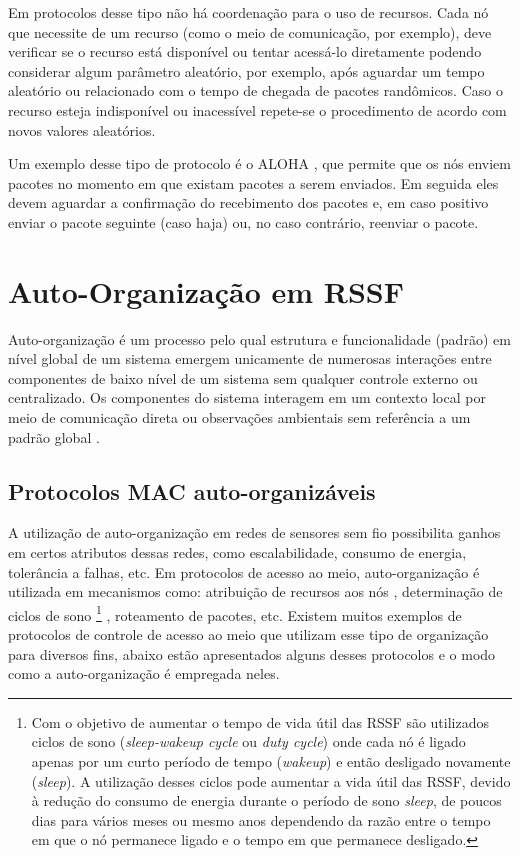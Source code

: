  Em protocolos desse tipo não há coordenação para o uso de recursos. Cada nó que necessite de um recurso (como o meio de comunicação, por exemplo), deve verificar se o recurso está disponível ou tentar acessá-lo diretamente podendo considerar algum parâmetro aleatório, por exemplo, após aguardar um tempo aleatório ou relacionado com o tempo de chegada de pacotes randômicos. Caso o recurso esteja indisponível ou inacessível repete-se o procedimento de acordo com novos valores aleatórios. 
 
 Um exemplo desse tipo de protocolo é o ALOHA \cite{Baccelli06analoha}, que permite que os nós enviem pacotes no momento em que existam pacotes a serem enviados. Em seguida eles devem aguardar a confirmação do recebimento dos pacotes e, em caso positivo enviar o pacote seguinte (caso haja) ou, no caso contrário, reenviar o pacote.
 
\section{Auto-Organização em RSSF}

 Auto-organização é um processo pelo qual estrutura e funcionalidade (padrão) em nível global de um sistema emergem unicamente de numerosas interações entre componentes de baixo nível de um sistema sem qualquer controle externo ou centralizado. Os componentes do sistema interagem em um contexto local por meio de comunicação direta ou observações ambientais sem referência a um padrão global \cite{Dressler2008}.
 
 \subsection{Protocolos MAC auto-organizáveis}
 
 A utilização de auto-organização em redes de sensores sem fio possibilita ganhos em certos atributos dessas redes, como escalabilidade, consumo de energia, tolerância a falhas, etc. Em protocolos de acesso ao meio, auto-organização é utilizada em mecanismos como: atribuição de recursos aos nós \cite{Dressler2008}, determinação de ciclos de sono%
 \footnote{Com o objetivo de aumentar o tempo de vida útil das RSSF são utilizados ciclos de sono (\textit{sleep-wakeup cycle} ou \textit{duty cycle}) onde cada nó é ligado apenas por um curto período de tempo (\textit{wakeup}) e então desligado novamente (\textit{sleep}). A utilização desses ciclos pode aumentar a vida útil das RSSF, devido à redução do consumo de energia durante o período de sono \textit{sleep}, de poucos dias para vários meses ou mesmo anos dependendo da razão entre o tempo em que o nó permanece ligado e o tempo em que permanece desligado.}
 \cite{Halkes:2005}, roteamento de pacotes, etc. Existem muitos exemplos de protocolos de controle de acesso ao meio que utilizam esse tipo de organização para diversos fins, abaixo estão apresentados alguns desses protocolos e o modo como a auto-organização é empregada neles.
 
